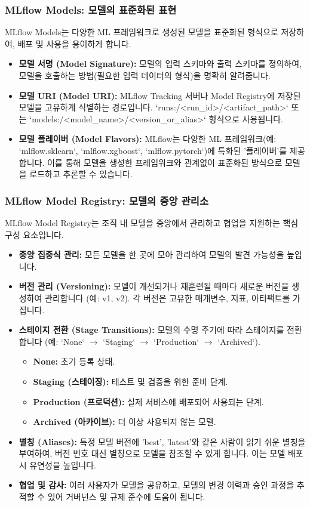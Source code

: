\documentclass[11pt,a4paper]{article}
\begin{document}
\subsubsection*{MLflow Models: 모델의 표준화된 표현}
MLflow Models는 다양한 ML 프레임워크로 생성된 모델을 표준화된 형식으로 저장하여, 배포 및 사용을 용이하게 합니다.
\begin{itemize}
    \item \textbf{모델 서명 (Model Signature):} 모델의 입력 스키마와 출력 스키마를 정의하여, 모델을 호출하는 방법(필요한 입력 데이터의 형식)을 명확히 알려줍니다.
    \item \textbf{모델 URI (Model URI):} MLflow Tracking 서버나 Model Registry에 저장된 모델을 고유하게 식별하는 경로입니다. `runs:/<run_id>/<artifact_path>` 또는 `models:/<model_name>/<version_or_alias>` 형식으로 사용됩니다.
    \item \textbf{모델 플레이버 (Model Flavors):} MLflow는 다양한 ML 프레임워크(예: `mlflow.sklearn`, `mlflow.xgboost`, `mlflow.pytorch`)에 특화된 '플레이버'를 제공합니다. 이를 통해 모델을 생성한 프레임워크와 관계없이 표준화된 방식으로 모델을 로드하고 추론할 수 있습니다.
\end{itemize}

\subsubsection*{MLflow Model Registry: 모델의 중앙 관리소}
MLflow Model Registry는 조직 내 모델을 중앙에서 관리하고 협업을 지원하는 핵심 구성 요소입니다.
\begin{itemize}
    \item \textbf{중앙 집중식 관리:} 모든 모델을 한 곳에 모아 관리하여 모델의 발견 가능성을 높입니다.
    \item \textbf{버전 관리 (Versioning):} 모델이 개선되거나 재훈련될 때마다 새로운 버전을 생성하여 관리합니다 (예: v1, v2). 각 버전은 고유한 매개변수, 지표, 아티팩트를 가집니다.
    \item \textbf{스테이지 전환 (Stage Transitions):} 모델의 수명 주기에 따라 스테이지를 전환합니다 (예: `None` $\rightarrow$ `Staging` $\rightarrow$ `Production` $\rightarrow$ `Archived`).
    \begin{itemize}
        \item \textbf{None:} 초기 등록 상태.
        \item \textbf{Staging (스테이징):} 테스트 및 검증을 위한 준비 단계.
        \item \textbf{Production (프로덕션):} 실제 서비스에 배포되어 사용되는 단계.
        \item \textbf{Archived (아카이브):} 더 이상 사용되지 않는 모델.
    \end{itemize}
    \item \textbf{별칭 (Aliases):} 특정 모델 버전에 'best', 'latest'와 같은 사람이 읽기 쉬운 별칭을 부여하여, 버전 번호 대신 별칭으로 모델을 참조할 수 있게 합니다. 이는 모델 배포 시 유연성을 높입니다.
    \item \textbf{협업 및 감사:} 여러 사용자가 모델을 공유하고, 모델의 변경 이력과 승인 과정을 추적할 수 있어 거버넌스 및 규제 준수에 도움이 됩니다.
\end{itemize}
\end{document}
